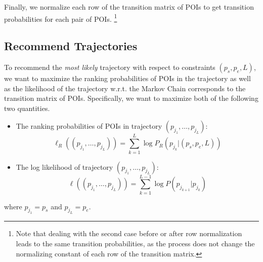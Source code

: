 Finally, we normalize each row of the transition matrix of POIs to get transition probabilities for each pair of POIs.
\footnote{Note that dealing with the second case before or after row normalization leads to the same transition probabilities, 
as the process does not change the normalizing constant of each row of the transition matrix.}


\subsection{Recommend Trajectories}
\label{method:recommend}

To recommend the \textit{most likely} trajectory with respect to constraints $(p_s, p_e, L)$,
we want to maximize the ranking probabilities of POIs in the trajectory as well as
the likelihood of the trajectory w.r.t. the Markov Chain corresponds to the transition matrix of POIs.
Specifically, we want to maximize both of the following two quantities.
\begin{itemize}
\item The ranking probabilities of POIs in trajectory $(p_{j_1}, \dots, p_{j_L})$:
      \begin{displaymath}
          \ell_R((p_{j_1}, \dots, p_{j_L})) = \sum_{k=1}^L \log P_R(p_{j_k} |(p_s, p_e, L))
      \end{displaymath}
\item The log likelihood of trajectory $(p_{j_1}, \dots, p_{j_L})$:
      \begin{displaymath}
          \ell((p_{j_1}, \dots, p_{j_L})) = \sum_{k=1}^{L-1} \log P(p_{j_{k+1}} | p_{j_k})
      \end{displaymath}
\end{itemize}
where $p_{j_1} = p_s$ and $p_{j_L} = p_e$.


